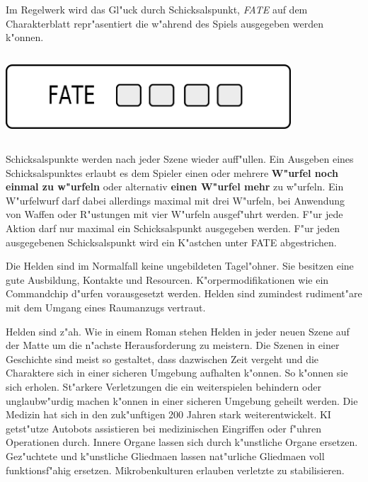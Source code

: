\begin{column}[l]{0.52}
    Im Regelwerk wird das Gl"uck durch Schicksalspunkt, \emph{FATE} auf dem Charakterblatt repr"asentiert die w"ahrend des Spiels ausgegeben werden k"onnen.
\end{column}
\begin{column}[r]{0.48}
    \centering
    \includegraphics[width=0.80\textwidth]{images/character_fate}    
\end{column}

Schicksalspunkte werden nach jeder Szene wieder auff"ullen. Ein Ausgeben eines Schicksalspunktes erlaubt es dem Spieler einen oder mehrere \textbf{W"urfel noch einmal zu w"urfeln} oder alternativ \textbf{einen W"urfel mehr} zu w"urfeln. Ein W"urfelwurf darf dabei allerdings maximal mit drei W"urfeln, bei Anwendung von Waffen oder R"ustungen mit vier W"urfeln ausgef"uhrt werden. F"ur jede Aktion darf nur maximal ein Schicksalspunkt ausgegeben werden. F"ur jeden ausgegebenen Schicksalspunkt wird ein K"astchen unter FATE abgestrichen.

Die Helden sind im Normalfall keine ungebildeten Tagel"ohner. Sie besitzen eine gute Ausbildung, Kontakte und Resourcen. K"orpermodifikationen wie ein Commandchip d"urfen vorausgesetzt werden. Helden sind zumindest rudiment"are mit dem Umgang eines Raumanzugs vertraut.

Helden sind z"ah. Wie in einem Roman stehen Helden in jeder neuen Szene auf der Matte um die n"achste Herausforderung zu meistern. Die Szenen in einer Geschichte sind meist so gestaltet, dass dazwischen Zeit vergeht und die Charaktere sich in einer sicheren Umgebung aufhalten k"onnen. So k"onnen sie sich erholen. St"arkere Verletzungen die ein weiterspielen behindern oder unglaubw"urdig machen k"onnen in einer sicheren Umgebung geheilt werden. Die Medizin hat sich in den zuk"unftigen 200 Jahren stark weiterentwickelt. KI getst"utze Autobots assistieren bei medizinischen Eingriffen oder f"uhren Operationen durch. Innere Organe lassen sich durch k"unstliche Organe ersetzen. Gez"uchtete und k"unstliche Gliedma\3en lassen nat"urliche Gliedma\3en voll funktionsf"ahig ersetzen. Mikrobenkulturen erlauben verletzte zu stabilisieren.


